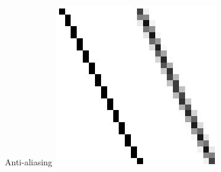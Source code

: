 \documentclass{lug}
\begin{document}
\begin{frame}{Anti-aliasing}
{        \includegraphics[width=\textwidth]{graphics/antialias_line}
    }
\end{frame}
\end{document}
